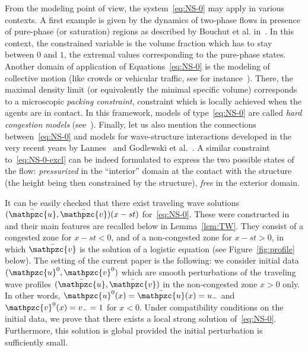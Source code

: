 \documentclass[AHL,Unicode,longabstracts,published]{cedram}
\newcommand{\bv}{\bar{\mathpzc{v}}}
\newcommand{\bu}{\bar{\mathpzc{u}}}
\newcommand{\tv}{\mathpzc{v}}
\newcommand{\tu}{\mathpzc{u}}
\begin{document}
From the modeling point of view, the system~\eqref{eq:NS-0} may apply in various contexts. A first example is given by the dynamics of two-phase flows in presence of pure-phase (or saturation) regions as described by Bouchut et al. in~\cite{bouchut2000}. In this context, the constrained variable is the volume fraction which has to stay between $0$ and $1$, the extremal values corresponding to the pure-phase states. Another domain of application of Equations~\eqref{eq:NS-0} is the modeling of collective motion (like crowds or vehicular traffic, see for instance~\cite{berthelin2017,degond2011,maury2011}). There, the maximal density limit (or equivalently the minimal specific volume) corresponds to a microscopic \emph{packing constraint}, constraint which is locally achieved when the agents are in contact. In this framework, models of type~\eqref{eq:NS-0} are called \emph{hard congestion models} (see~\cite{maury2012}). Finally, let us also mention the connections between~\eqref{eq:NS-0} and models for wave-structure interactions developed in the very recent years by Lannes~\cite{lannes2017} and Godlewski et al.~\cite{godlewski2018}. A similar constraint to~\eqref{eq:NS-0-excl} can be indeed formulated to express the two possible states of the flow: \emph{pressurized} in the ``interior'' domain at the contact with the structure (the height being then constrained by the structure), \emph{free} in the exterior domain.


It can be easily checked that there exist traveling wave solutions $(\bu, \bv)(x-st)$ for~\eqref{eq:NS-0}. These were constructed in~\cite{DP} and their main features are recalled below in Lemma~\ref{lem:TW}. They consist of a congested zone for $x-st<0$, and of a non-congested zone for $x-st>0$, in which $\bv$ is the solution of a logistic equation (see Figure~\ref{fig:profile} below). The setting of the current paper is the following: we consider initial data $(\tu^0, \tv^0)$ which are smooth perturbations of the traveling wave profiles $(\bu,\bv)$ in the non-congested zone $x>0$ only. In other words, $\tu^0(x)=\bu(x)=u_-$ and $\tv^0(x)=v_-=1$ for $x<0$. Under compatibility conditions on the initial data, we prove that there exists a local strong solution of~\eqref{eq:NS-0}. Furthermore, this solution is global provided the initial perturbation is sufficiently small.
\end{document}

